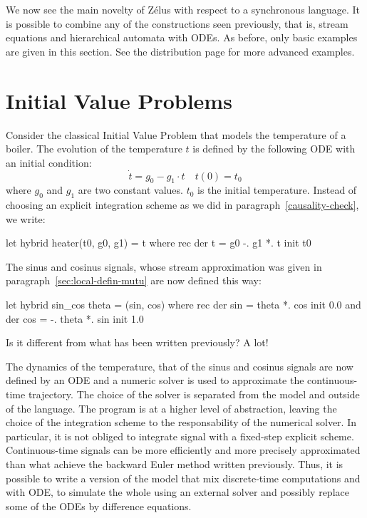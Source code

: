 \documentclass[11pt,titlepage,twoside]{report}
\newcommand{\zelus}{{\sf Z\'elus}}
\begin{document}
We now see the main novelty of \zelus{} with respect to a
synchronous language. It is possible to combine any of the
constructions seen previously, that is, stream equations and hierarchical
automata with \acp{ODE}. As before, only
basic examples are given in this section. See the distribution page for
more advanced examples.

\section{Initial Value Problems}
Consider the classical Initial Value Problem that models the temperature
of a boiler. The evolution of the temperature $t$ is defined by the following
\ac{ODE} with an initial condition:
\[
\dot{t} = g_0 - g_1 \cdot t \quad t(0) = t_0
\]
where $g_0$ and $g_1$ are two constant values.
$t_0$ is the initial temperature. Instead
of choosing an explicit integration scheme as we did in
paragraph~\cref{causality-check}, we write:

\begin{runverbatim}[withresult]
let hybrid heater(t0, g0, g1) = t where
  rec der t = g0 -. g1 *. t init t0
\end{runverbatim}

The sinus and cosinus signals, whose stream approximation was given in
paragraph~\cref{sec:local-defin-mutu} are now defined this way:
\begin{runverbatim}[withresult]
let hybrid sin_cos theta = (sin, cos) where
  rec der sin = theta *. cos init 0.0
  and der cos = -. theta *. sin init 1.0
\end{runverbatim}

Is it different from what has been written previously? A lot!

\medskip
The dynamics of the temperature, that of the sinus and cosinus signals
are now defined by an \ac{ODE} and a
numeric solver is used to approximate the continuous-time
trajectory. The choice of the solver is separated from the model and
outside of the language. The program is at a higher level of
abstraction, leaving the choice of the integration scheme to the
responsability of the numerical solver. In particular, it is not
obliged to integrate signal with a fixed-step explicit
scheme. Continuous-time signals can be more efficiently and more
precisely approximated than what achieve the backward Euler method
written previously. Thus, it is possible to write a version of the
model that mix discrete-time computations and with \ac{ODE},
to simulate the whole using an external solver and possibly replace some of the
\acp{ODE} by difference equations.
\end{document}
